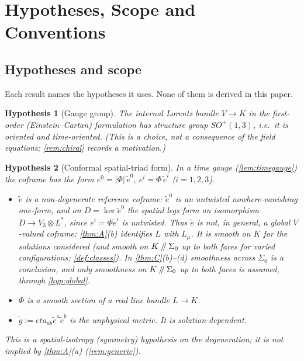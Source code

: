 \documentclass[11pt]{article}
\theoremstyle{canonmath}
\theoremstyle{canonpostulate}
\theoremstyle{canonproposition}
\theoremstyle{canonmath}
\theoremstyle{canonproposition}
\newtheorem{hypothesis}{Hypothesis}
\providecommand{\cutK}{\Klein\mathbin{/\mkern-5mu/}\Sigma_0}
\providecommand{\Lmu}{\mathcal{L}_\mu}
\providecommand{\Vb}{\mathcal{V}}
\providecommand{\Klein}{\mathcal{K}}
\def\mathcal#1{#1}%
\def\eta{eta}%
\begin{document}
\section{Hypotheses, Scope and Conventions}
\label{sec:hypotheses}

\subsection{Hypotheses and scope}

Each result names the hypotheses it uses. None of them is derived in this paper.

\begin{hypothesis}[Gauge group]\label{hyp:gauge}
The internal Lorentz bundle $\Vb \to \Klein$ in the first-order (Einstein--Cartan) formulation has structure group $SO^+(1,3)$, i.e.\ it is oriented and time-oriented. (This is a choice, not a consequence of the field equations; \cref{rem:chiral} records a motivation.)
\end{hypothesis}

\begin{hypothesis}[Conformal spatial-triad form]\label{hyp:triad}
In a time gauge (\cref{lem:timegauge}) the coframe has the form $e^0 = |\Phi|\,\tilde{e}^0$, $e^i = \Phi\,\tilde{e}^i$ ($i = 1,2,3$).
\begin{itemize}
\item $\tilde{e}$ is a non-degenerate reference coframe: $\tilde{e}^0$ is an untwisted nowhere-vanishing one-form, and on $D = \ker\tilde e^0$ the spatial legs form an isomorphism $D\to\Vb_3\otimes L^*$, since $e^i = \Phi\tilde e^i$ is untwisted. Thus $\tilde e$ is not, in general, a global $\Vb$-valued coframe; \cref{thm:A}(b) identifies $L$ with $\Lmu$. It is smooth on $\Klein$ for the solutions considered (and smooth on $\cutK$ up to both faces for varied configurations; \cref{def:classes}). In \cref{thm:C}(b)--(d) smoothness across $\Sigma_0$ is a conclusion, and only smoothness on $\cutK$ up to both faces is assumed, through \ref{hyp:global}.
\item $\Phi$ is a smooth section of a real line bundle $L \to \Klein$.
\item $\tilde g := \eta_{ab}\tilde e^a\tilde e^b$ is the unphysical metric. It is solution-dependent.
\end{itemize}
This is a spatial-isotropy (symmetry) hypothesis on the degeneration; it is not implied by \cref{thm:A}(a) (\cref{rem:generic}).
\end{hypothesis}
\end{document}
